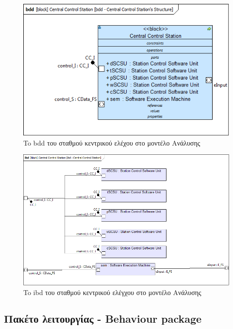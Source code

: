 \documentclass[a4paper,12pt,twoside]{report}
\begin{document}
{\begin{appendices}
			\begin{figure}[hp]
					\centering
					\includegraphics[scale=0.50]{AnalysisModel_bdd-CentralControlStationsStructure.png}
					\caption{To bdd του σταθμού κεντρικού ελέχου στο μοντέλο Ανάλυσης}
					\label{φωτ:To bdd του σταθμού κεντρικού ελέγχου στο μοντέλο Ανάλυσης}
			\end{figure}
			
			\begin{figure}[hp]
					\centering
					\includegraphics[scale=0.50]{AnalysisModel_ibd-CentralControlStation.png}
					\caption{To ibd του σταθμού κεντρικού ελέγχου στο μοντέλο Ανάλυσης}
					\label{φωτ:To ibd του σταθμού κεντρικού ελέγχου στο μοντέλο Ανάλυσης}
			\end{figure}

			\FloatBarrier
			\subsection{Πακέτο λειτουργίας - Behaviour package}


\end{appendices}}
\end{document}
